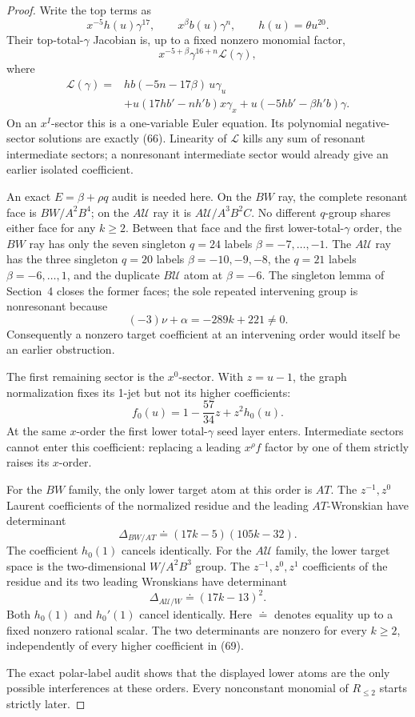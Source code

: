 \documentclass[11pt]{article}
\theoremstyle{remark}
\newcommand{\cU}{\mathcal U}
\begin{document}
\begin{proof}
Write the top terms as
\[
x^{-5}h(u)\gamma^{17},\qquad x^\beta b(u)\gamma^n,
\qquad h(u)=\theta u^{20}.
\]
Their top-total-\(\gamma\) Jacobian is, up to a fixed nonzero monomial
factor,
\[
x^{-5+\beta}\gamma^{16+n}\mathcal L(\gamma),
\tag{67}
\]
where
\[
\begin{aligned}
\mathcal L(\gamma)={}&
hb(-5n-17\beta)\,u\gamma_u\\
&+u(17hb'-nh'b)x\gamma_x
+u(-5hb'-\beta h'b)\gamma .
\end{aligned}
\tag{68}
\]
On an \(x^I\)-sector this is a one-variable Euler equation.  Its
polynomial negative-sector solutions are exactly (66).  Linearity of
\(\mathcal L\) kills any sum of resonant intermediate sectors; a
nonresonant intermediate sector would already give an earlier isolated
coefficient.

An exact \(E=\beta+\rho q\) audit is needed here.  On the \(BW\) ray,
the complete resonant face is \(BW/A^2B^4\); on the \(A\cU\) ray it is
\(A\cU/A^3B^2C\).  No different \(q\)-group shares either face for
any \(k\ge2\).  Between that face and the first lower-total-\(\gamma\)
order, the \(BW\) ray has only the seven singleton \(q=24\) labels
\(\beta=-7,\ldots,-1\).  The \(A\cU\) ray has the three singleton
\(q=20\) labels \(\beta=-10,-9,-8\), the \(q=21\) labels
\(\beta=-6,\ldots,1\), and the duplicate \(B\cU\) atom at
\(\beta=-6\).  The singleton lemma of Section~4 closes the former
faces; the sole repeated intervening group is nonresonant because
\[
(-3)\nu+\alpha=-289k+221\ne0.
\]
Consequently a nonzero target coefficient at an intervening order would
itself be an earlier obstruction.

The first remaining sector is the \(x^0\)-sector.  With \(z=u-1\), the
graph normalization fixes its 1-jet but not its higher coefficients:
\[
f_0(u)=1-\frac{57}{34}z+z^2h_0(u).
\tag{69}
\]
At the same \(x\)-order the first lower total-\(\gamma\) seed layer
enters.  Intermediate sectors cannot enter this coefficient: replacing
a leading \(x^\rho f\) factor by one of them strictly raises its
\(x\)-order.

For the \(BW\) family, the only lower target atom at this order is
\(AT\).  The \(z^{-1},z^0\) Laurent coefficients of the normalized
residue and the leading \(AT\)-Wronskian have determinant
\[
\Delta_{BW/AT}\doteq(17k-5)(105k-32).
\tag{70}
\]
The coefficient \(h_0(1)\) cancels identically.  For the \(A\cU\)
family, the lower target space is the two-dimensional
\(W/A^2B^3\) group.  The \(z^{-1},z^0,z^1\) coefficients of the
residue and its two leading Wronskians have determinant
\[
\Delta_{A\cU/W}\doteq(17k-13)^2.
\tag{71}
\]
Both \(h_0(1)\) and \(h_0'(1)\) cancel identically.  Here \(\doteq\)
denotes equality up to a fixed nonzero rational scalar.  The two
determinants are nonzero for every \(k\ge2\), independently of every
higher coefficient in (69).

The exact polar-label audit shows that the displayed lower atoms are the
only possible interferences at these orders.  Every nonconstant monomial
of \(R_{\le2}\) starts strictly later.
\end{proof}
\end{document}
